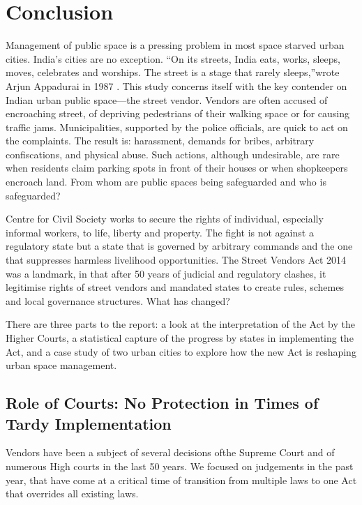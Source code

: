 \documentclass[a4paper, 12pt, twoside]{article}
\begin{document}
{{%
\newpage
\section*{Conclusion}

Management of public space is a pressing problem in most space starved urban cities. India’s cities are no exception. “On its streets, India eats, works, sleeps, moves, celebrates and worships. The street is a stage that rarely sleeps,”wrote Arjun Appadurai in 1987 \parencite{naikpaper}. This study concerns itself with the key contender on Indian urban public space—the street vendor. Vendors are often accused of encroaching street, of depriving pedestrians of their walking space or for causing traffic jams. Municipalities, supported by the police officials, are quick to act on the complaints. The result is: harassment, demands for bribes, arbitrary confiscations, and physical abuse. Such actions, although undesirable, are rare when residents claim parking spots in front of their houses or when shopkeepers encroach land. From whom are public spaces being safeguarded and who is safeguarded?

Centre for Civil Society works to secure the rights of individual, especially informal workers, to life, liberty and property. The fight is not against a regulatory state but a state that is governed by arbitrary commands and the one that suppresses harmless livelihood opportunities. The Street Vendors Act 2014 was a landmark, in that after 50 years of judicial and regulatory clashes, it legitimise rights of street vendors and mandated states to create rules, schemes and local governance structures. What has changed?

There are three parts to the report: a look at the interpretation of the Act by the Higher Courts, a statistical capture of the progress by states in implementing the Act, and a case study of two urban cities to explore how the new Act is reshaping urban space management.

\subsection*{Role of Courts: No Protection in Times of Tardy Implementation}
Vendors have been a subject of several decisions ofthe Supreme Court and of numerous High courts in the last 50 years. We focused on judgements in the past year, that have come at a critical time of transition from multiple laws to one Act that overrides all existing laws.

}}
\end{document}
